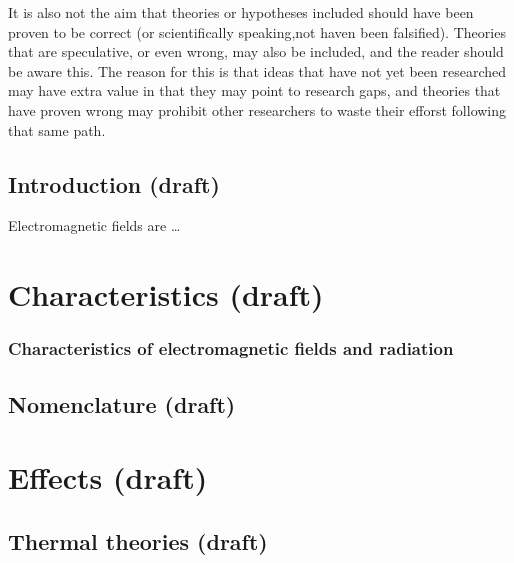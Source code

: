 \documentclass[
  letterpaper,
  DIV=11,
  numbers=noendperiod]{scrreprt}
\begin{document}
It is also not the aim that theories or hypotheses included should have
been proven to be correct (or scientifically speaking,not haven been
falsified). Theories that are speculative, or even wrong, may also be
included, and the reader should be aware this. The reason for this is
that ideas that have not yet been researched may have extra value in
that they may point to research gaps, and theories that have proven
wrong may prohibit other researchers to waste their efforst following
that same path.


\hypertarget{introduction-draft}{%
\chapter{Introduction (draft)}\label{introduction-draft}}

Electromagnetic fields are \ldots{}

\part{Characteristics (draft)}

\hypertarget{characteristics-of-electromagnetic-fields-and-radiation}{%
\section*{Characteristics of electromagnetic fields and
radiation}\label{characteristics-of-electromagnetic-fields-and-radiation}}


\hypertarget{nomenclature-draft}{%
\chapter{Nomenclature (draft)}\label{nomenclature-draft}}

\part{Effects (draft)}

\hypertarget{thermal-theories-draft}{%
\chapter{Thermal theories (draft)}\label{thermal-theories-draft}}
\end{document}
